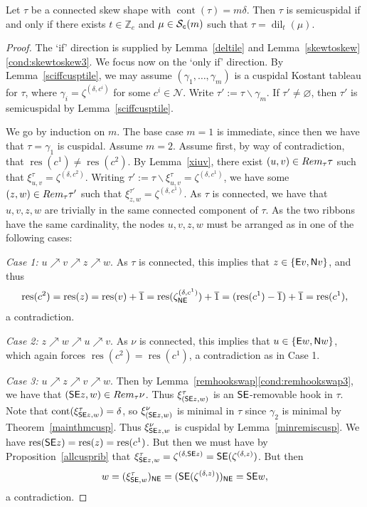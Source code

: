 \documentclass[Unicode,ALCO]{cedram}
\newcommand{\res}{\operatorname{res}}
\newcommand{\infl}{\operatorname{dil}}
\newcommand{\Z}{\mathbb{Z}}
\newcommand{\N}{\mathcal{N}}
\newcommand{\SSSS}{\mathcal{S}}
\newcommand{\0}{{\bar 0}}
\newcommand{\no}{{\sf N}}
\newcommand{\ea}{{\sf E}}
\newcommand{\nnee}{{\sf NE}}
\newcommand{\ssee}{{\sf SE}}
\def\cont{{\operatorname{cont}}}
\begin{document}
\begin{prop}\label{conissemicusp}
Let \(\tau\) be a connected skew shape with \(\cont(\tau) = m\delta\). Then \(\tau\) is semicuspidal if and only if there exists \(t \in \Z_e\) and \(\mu \in \SSSS_{\tt c}(m)\) such that \(\tau = \infl_t(\mu)\).
\end{prop}
\begin{proof}
The `if' direction is supplied by Lemma~\ref{deltile} and Lemma~\ref{skewtoskew}\eqref{cond:skewtoskew3}. We focus now on the `only if' direction. 
By Lemma~\ref{sciffcusptile}, we may assume \((\gamma_1, \ldots, \gamma_m)\) is a cuspidal Kostant tableau for \(\tau\), where \(\gamma_i = \zeta^{(\delta, c^i)}\) for some \(c^i \in \N\). Write \(\tau' := \tau \backslash \gamma_m\). If \(\tau' \neq \varnothing\), then \(\tau'\) is semicuspidal by Lemma~\ref{sciffcusptile}.


We go by induction on \(m\). The base case \(m=1\) is immediate, since then we have that \(\tau=\gamma_1\) is cuspidal. Assume \(m=2\).
Assume first, by way of contradiction, that \(\res(c^1) \neq \res(c^2)\). By Lemma~\ref{xiuv}, there exist \((u,v) \in \textup{Rem}_\tau\tau\) such that \(\xi^\tau_{u,v} = \zeta^{(\delta, c^2)}\). Writing \(\tau' := \tau \backslash \xi^\tau_{u,v} = \zeta^{(\delta, c^1)} \), we have some \((z,w) \in \textup{Rem}_\tau{\tau'}\) such that \(\xi^{\tau'}_{z,w} = \zeta^{(\delta, c^1)}\). As \(\tau\) is connected, we have that \(u,v,z,w\) are trivially in the same connected component of \(\tau\). As the two ribbons have the same cardinality, the nodes \(u,v,z,w\) must be arranged as in one of the following cases:


{\em Case 1:} \(u \nearrow v \nearrow z \nearrow w\). As \(\tau\) is connected, this implies that \(z \in \{\ea v, \no v\}\), and thus
\begin{align*}
\res(c^2) = \res(z) = \res(v)+\overline 1 = \res(\zeta^{(\delta,c^1)}_\nnee) + \overline 1 = (\res(c^1) - \overline 1)+ \overline 1 = \res(c^1),
\end{align*} 
a contradiction. 

{\em Case 2:} \(z \nearrow w \nearrow u \nearrow v\). As \(\nu\) is connected, this implies that \(u \in \{\ea w, \no w\}\), which again forces \(\res(c^2) = \res(c^1)\), a contradiction as in Case 1.

{\em Case 3:} \(u \nearrow z \nearrow v \nearrow w\). Then by Lemma~\ref{remhookswap}\eqref{cond:remhookswap3}, we have that \((\ssee z,w) \in \textup{Rem}_\tau\nu\). Thus \(\xi^\tau_{(\ssee z, w)}\) is an \(\ssee\)-removable hook in \(\tau\). Note that \(\cont(\xi^\tau_{\ssee z, w}) = \delta\), so 
\(\xi^\nu_{(\ssee z, w)}\) is minimal in \(\tau\) since \(\gamma_2\) is minimal by Theorem~\ref{mainthmcusp}. Thus \(\xi^\nu_{\ssee z, w}\) is cuspidal by Lemma~\ref{minremiscusp}. We have \(\res(\ssee z) = \res(z) = \res(c^1)\). But then we must have by Proposition~\ref{allcusprib} that \(\xi^\tau_{\ssee z, w} = \zeta^{(\delta, \ssee z)} = \ssee(\zeta^{(\delta, z)})\). But then
\begin{align*}
w = (\xi^\tau_{\ssee, w})_\nnee = (\ssee(\zeta^{(\delta, z)}))_\nnee = \ssee w,
\end{align*}
a contradiction. 


\end{proof}
\end{document}
